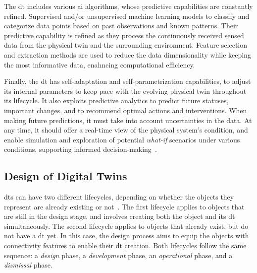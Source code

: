     The \acrshort{dt} includes various \acrshort{ai} algorithms, whose predictive capabilities are constantly refined. Supervised and/or unsupervised machine learning models to classify and categorize data points based on past observations and known patterns. Their predictive capability is refined as they process the continuously received sensed data from the physical twin and the surrounding environment. Feature selection and extraction methods are used to reduce the data dimensionality while keeping the most informative data, enahncing computational efficiency.

    Finally, the \acrshort{dt} has self-adaptation and self-parametrization capabilities, to adjust its internal parameters to keep pace with the evolving physical twin throughout its lifecycle. It also exploits predictive analytics to predict future statuses, important changes, and to recommend optimal actions and interventions. When making future predictions, it must take into account uncertainties in the data. At any time, it should offer a real-time view of the physical system's condition, and enable simulation and exploration of potential \textit{what-if} scenarios under various conditions, supporting informed decision-making~\parencite{boschertDigitalTwinSimulation2016}.
\fi

\subsection{Design of Digital Twins}\label{sec:dt_design}

\acrshort{dt}s can have two different lifecycles, depending on whether the objects they represent are already existing or not~\parencite{barricelliSurveyDigitalTwin2019}. The first lifecycle applies to objects that are still in the design stage, and involves creating both the object and its \acrshort{dt} simultaneously. The second lifecycle applies to objects that already exist, but do not have a \acrshort{dt} yet. In this case, the design process aims to equip the objects with connectivity features to enable their \acrshort{dt} creation. Both lifecycles follow the same sequence: a \textit{design} phase, a \textit{development} phase, an \textit{operational} phase, and a \textit{dismissal} phase.

